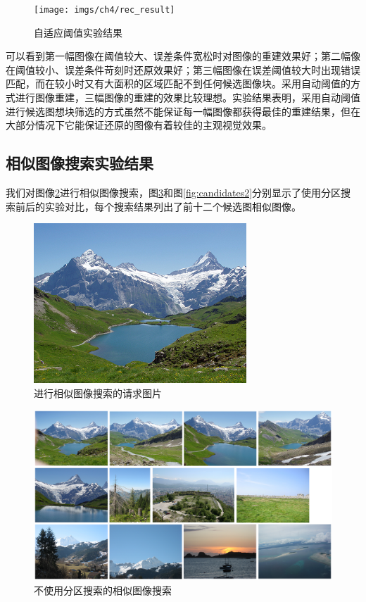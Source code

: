 \begin{figure}
\centering\texttt{[image: imgs/ch4/rec\_result]}
\caption{自适应阈值实验结果}
\label{fig:result}
\end{figure}

可以看到第一幅图像在阈值较大、误差条件宽松时对图像的重建效果好；第二幅像在阈值较小、误差条件苛刻时还原效果好；第三幅图像在误差阈值较大时出现错误匹配，而在较小时又有大面积的区域匹配不到任何候选图像块。采用自动阈值的方式进行图像重建，三幅图像的重建的效果比较理想。实验结果表明，采用自动阈值进行候选图想块筛选的方式虽然不能保证每一幅图像都获得最佳的重建结果，但在大部分情况下它能保证还原的图像有着较佳的主观视觉效果。


\subsection{相似图像搜索实验结果}
我们对图像\ref{fig:candi_query}进行相似图像搜索，图\ref{fig:candidates1}和图\ref{fig:candidates2}分别显示了使用分区搜索前后的实验对比，每个搜索结果列出了前十二个候选图相似图像。
\begin{figure}
\centering\includegraphics[width=8cm]{imgs/ch4/candi_query}
\caption{进行相似图像搜索的请求图片}
\label{fig:candi_query}
\end{figure}

\begin{figure}
\centering\includegraphics[width=15cm]{imgs/ch4/candidates1}
\caption{不使用分区搜索的相似图像搜索}
\label{fig:candidates1}
\end{figure}

